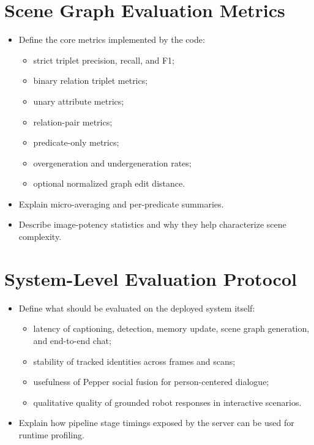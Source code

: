 \documentclass[
  digital,     %
  oneside,     %
  nosansbold,  %
  nocolorbold, %
  lof,         %
  lot,         %
]{fithesis4}
\begin{document}
\section{Scene Graph Evaluation Metrics}
\begin{itemize}
    \item Define the core metrics implemented by the code:
    \begin{itemize}
        \item strict triplet precision, recall, and F1;
        \item binary relation triplet metrics;
        \item unary attribute metrics;
        \item relation-pair metrics;
        \item predicate-only metrics;
        \item overgeneration and undergeneration rates;
        \item optional normalized graph edit distance.
    \end{itemize}
    \item Explain micro-averaging and per-predicate summaries.
    \item Describe image-potency statistics and why they help characterize scene complexity.
\end{itemize}

\section{System-Level Evaluation Protocol}
\begin{itemize}
    \item Define what should be evaluated on the deployed system itself:
    \begin{itemize}
        \item latency of captioning, detection, memory update, scene graph generation, and end-to-end chat;
        \item stability of tracked identities across frames and scans;
        \item usefulness of Pepper social fusion for person-centered dialogue;
        \item qualitative quality of grounded robot responses in interactive scenarios.
    \end{itemize}
    \item Explain how pipeline stage timings exposed by the server can be used for runtime profiling.
\end{itemize}
\end{document}
